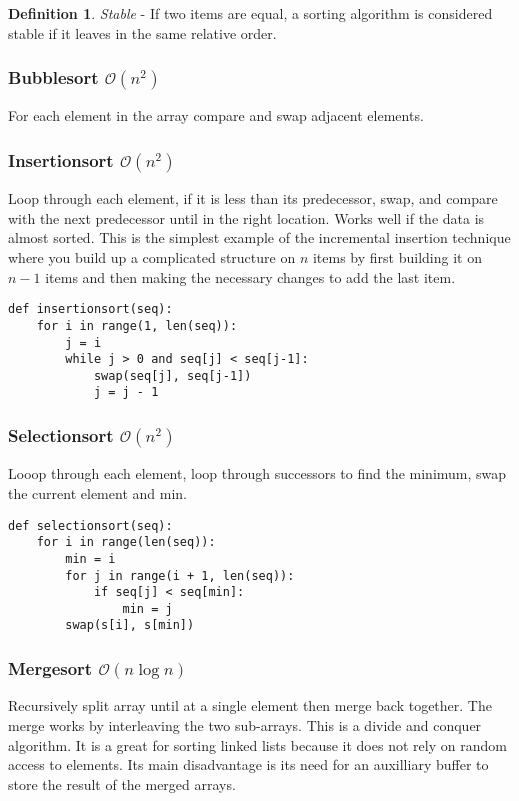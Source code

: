 \documentclass[10pt]{article}
\theoremstyle{definition}
\newtheorem*{definition}{Definition}
\begin{document}
\begin{definition}
    \textit{Stable} - If two items are equal, a sorting algorithm is considered stable if it leaves in the same relative order.
\end{definition}

\subsubsection{Bubblesort $\mathcal{O}(n^2)$}
For each element in the array compare and swap adjacent elements.

\subsubsection{Insertionsort $\mathcal{O}(n^2)$}
Loop through each element, if it is less than its predecessor, swap, and compare with the next predecessor until in the right location. Works well if the data is almost sorted. This is the simplest example of the incremental insertion technique where you build up a complicated structure on $n$ items by first building it on $n-1$ items and then making the necessary changes to add the last item.
\begin{lstlisting}
def insertionsort(seq):
    for i in range(1, len(seq)):
        j = i
        while j > 0 and seq[j] < seq[j-1]:
            swap(seq[j], seq[j-1])
            j = j - 1
\end{lstlisting}

\subsubsection{Selectionsort $\mathcal{O}(n^2)$}
Looop through each element, loop through successors to find the minimum, swap the current element and min.
\begin{lstlisting}
def selectionsort(seq):
    for i in range(len(seq)):
        min = i
        for j in range(i + 1, len(seq)):
            if seq[j] < seq[min]:
                min = j
        swap(s[i], s[min])
\end{lstlisting}

\subsubsection{Mergesort $\mathcal{O}(n\log n)$}
Recursively split array until at a single element then merge back together. The merge works by interleaving the two sub-arrays. This is a divide and conquer algorithm. It is a great for sorting linked lists because it does not rely on random access to elements. Its main disadvantage is its need for an auxilliary buffer to store the result of the merged arrays.
\end{document}
